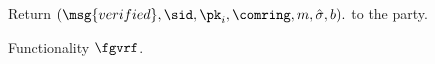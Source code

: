 \begin{figure}
\begin{tcolorbox}
{\begin{description}
				Return $(\msg{verified}, \sid, \pk_i, \comring, m, \hat\sigma, b).$ to the party.
			\end{description}
		}
	\end{tcolorbox}
	\caption{Functionality $\fgvrf$.\label{f:gvrf}}
\end{figure}


